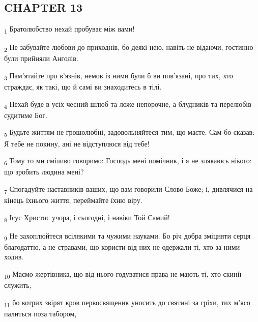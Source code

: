 \subsection{CHAPTER 13}
\begin{tcolorbox}
\textsubscript{1} Братолюбство нехай пробуває між вами!
\end{tcolorbox}
\begin{tcolorbox}
\textsubscript{2} Не забувайте любови до приходнів, бо деякі нею, навіть не відаючи, гостинно були прийняли Анголів.
\end{tcolorbox}
\begin{tcolorbox}
\textsubscript{3} Пам'ятайте про в'язнів, немов із ними були б ви пов'язані, про тих, хто страждає, як такі, що й самі ви знаходитесь в тілі.
\end{tcolorbox}
\begin{tcolorbox}
\textsubscript{4} Нехай буде в усіх чесний шлюб та ложе непорочне, а блудників та перелюбів судитиме Бог.
\end{tcolorbox}
\begin{tcolorbox}
\textsubscript{5} Будьте життям не грошолюбні, задовольняйтеся тим, що маєте. Сам бо сказав: Я тебе не покину, ані не відступлюся від тебе!
\end{tcolorbox}
\begin{tcolorbox}
\textsubscript{6} Тому то ми сміливо говоримо: Господь мені помічник, і я не злякаюсь нікого: що зробить людина мені?
\end{tcolorbox}
\begin{tcolorbox}
\textsubscript{7} Спогадуйте наставників ваших, що вам говорили Слово Боже; і, дивлячися на кінець їхнього життя, переймайте їхню віру.
\end{tcolorbox}
\begin{tcolorbox}
\textsubscript{8} Ісус Христос учора, і сьогодні, і навіки Той Самий!
\end{tcolorbox}
\begin{tcolorbox}
\textsubscript{9} Не захоплюйтеся всілякими та чужими науками. Бо річ добра зміцняти серця благодаттю, а не стравами, що користи від них не одержали ті, хто за ними ходив.
\end{tcolorbox}
\begin{tcolorbox}
\textsubscript{10} Маємо жертівника, що від нього годуватися права не мають ті, хто скинії служить,
\end{tcolorbox}
\begin{tcolorbox}
\textsubscript{11} бо котрих звірят кров первосвященик уносить до святині за гріхи, тих м'ясо палиться поза табором,
\end{tcolorbox}
